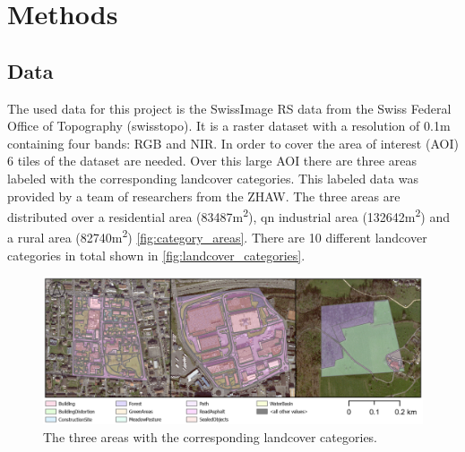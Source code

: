 

\section{Methods}
\label{methods}

\subsection{Data}%

The used data for this project is the SwissImage RS \autocite{SWISSIMAGERS} data from the Swiss Federal Office of Topography (swisstopo).
It is a raster dataset with a resolution of 0.1m containing four bands: RGB and NIR.
In order to cover the area of interest (AOI) 6 tiles of the dataset are needed.
Over this large AOI there are three areas labeled with the corresponding landcover categories.
This labeled data was provided by a team of researchers from the ZHAW. The three
areas are distributed over a residential area (83487m\textsuperscript{2}),
qn industrial area (132642m\textsuperscript{2}) and a rural area (82740m\textsuperscript{2}) \autoref{fig:category_areas}.
There are 10 different landcover categories in total shown in \autoref{fig:landcover_categories}.

\begin{figure}[H]
    \centering
    \captionsetup{width=0.8\linewidth}
    \includegraphics[width=\linewidth]{figures/category_areas.png}
    \caption{The three areas with the corresponding landcover categories.}
    \label{fig:category_areas}
\end{figure}

